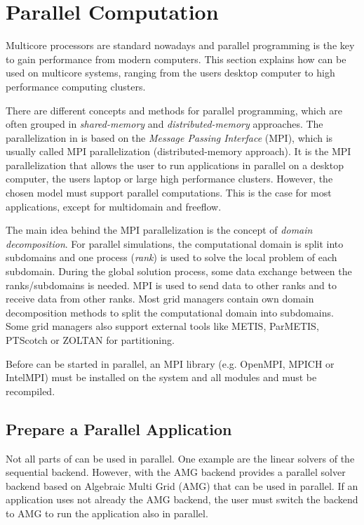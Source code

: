 \section{Parallel Computation}
\label{sec:parallelcomputation}
Multicore processors are standard nowadays and parallel programming is the key to gain
performance from modern computers. This section explains how \Dumux can be used 
on multicore systems, ranging from the users desktop computer to high performance
computing clusters.  

There are different concepts and methods for parallel programming, which are
often grouped in \textit{shared-memory} and \textit{distributed-memory}  
approaches. The parallelization in \Dumux is based on the 
\textit{Message Passing Interface} (MPI), which is usually called MPI parallelization (distributed-memory approach). 
It is the MPI parallelization that allows the user to run
\Dumux applications in parallel on a desktop computer, the users laptop or 
large high performance clusters. However, the chosen \Dumux 
model must support parallel computations. 
This is the case for most \Dumux applications, except for multidomain and 
freeflow.

The main idea behind the MPI parallelization is the concept of \textit{domain 
decomposition}. For parallel simulations, the computational domain is split into 
subdomains and one process (\textit{rank}) is used to solve the local problem of each 
subdomain. During the global solution process, some data exchange between the 
ranks/subdomains is needed. MPI is used to send data to other ranks and to receive 
data from other ranks. 
Most grid managers contain own domain decomposition methods to split the 
computational domain  into subdomains. Some grid managers also support external 
tools like METIS, ParMETIS, PTScotch or ZOLTAN for partitioning.

Before \Dumux can be started in parallel, an 
MPI library (e.g. OpenMPI, MPICH or IntelMPI) 
must be installed on the system and all \Dune modules and \Dumux must be recompiled.  


\subsection{Prepare a Parallel Application}
Not all parts of \Dumux can be used in parallel. One example are the linear solvers
of the sequential backend. However, with the AMG backend \Dumux provides 
a parallel solver backend based on Algebraic Multi Grid (AMG) that can be used in
parallel. 
If an application uses not already the AMG backend, the 
user must switch the backend to AMG to run the application also in parallel.

